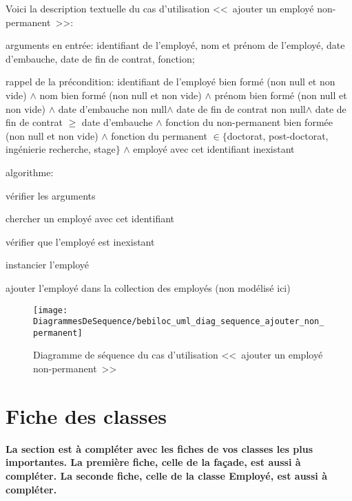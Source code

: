 \documentclass[11pt,article]{article}
\newcommand{\nullvalue}{\textsf{null}\xspace}
\begin{document}
\noindent
Voici la description textuelle du cas d'utilisation <<~ajouter un employé non-permanent~>>:
\begin{compactitem}
\item arguments en entrée: identifiant de l'employé, nom et prénom de
  l'employé, date d'embauche, date de fin de contrat, fonction;
\item rappel de la précondition: identifiant de l'employé bien formé
  (non \nullvalue et non vide) $\land$ nom bien formé (non \nullvalue
  et non vide) $\land$ prénom bien formé (non \nullvalue et non vide)
  $\land$ date d'embauche non \nullvalue $\land$ date de fin de
  contrat non \nullvalue $\land$ date de fin de contrat $\geq$ date
  d'embauche $\land$ fonction du non-permanent bien formée (non
  \nullvalue et non vide) $\land$ fonction du permanent $\in
  \{$doctorat, post-doctorat, ingénierie recherche, stage$\}$ $\land$
  employé avec cet identifiant inexistant
\item algorithme:
\begin{compactenum}
\item vérifier les arguments
\item chercher un employé avec cet identifiant
\item vérifier que l'employé est inexistant
\item instancier l'employé
\item ajouter l'employé dans la collection des employés (non modélisé ici)
\end{compactenum}
\end{compactitem}

\newpage

\begin{figure}[ht!]
\begin{center}
\texttt{[image: DiagrammesDeSequence/bebiloc\_uml\_diag\_sequence\_ajouter\_non\_permanent]}
\caption{Diagramme de séquence du cas d'utilisation <<~ajouter un
  employé non-permanent~>>}
\end{center}
\label{umlet_diag_sequence_ajouter_non_permanent}
\end{figure}

\newpage

\section{Fiche des classes}

{\color{red}\textbf{La section est à compléter avec les fiches de vos
    classes les plus importantes. La première fiche, celle de la
    façade, est aussi à compléter. La seconde fiche, celle de la
    classe \textsf{Employé}, est aussi à compléter.}}
\end{document}
